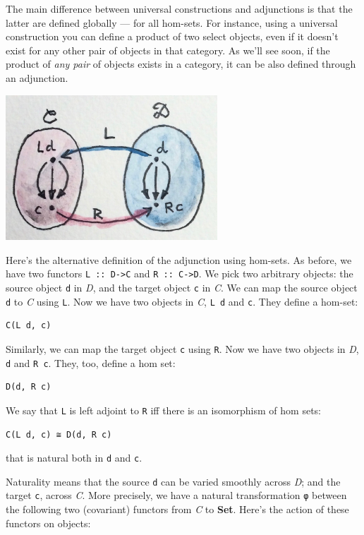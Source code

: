 The main difference between universal constructions and adjunctions is
that the latter are defined globally --- for all hom-sets. For instance,
using a universal construction you can define a product of two select
objects, even if it doesn't exist for any other pair of objects in that
category. As we'll see soon, if the product of \emph{any pair} of
objects exists in a category, it can be also defined through an
adjunction.

\includegraphics[width=3.12500in]{images/adj-homsets.jpg}

Here's the alternative definition of the adjunction using hom-sets. As
before, we have two functors \texttt{L\ ::\ D-\textgreater{}C} and
\texttt{R\ ::\ C-\textgreater{}D}. We pick two arbitrary objects: the
source object \texttt{d} in \emph{D}, and the target object \texttt{c}
in \emph{C}. We can map the source object \texttt{d} to \emph{C} using
\texttt{L}. Now we have two objects in \emph{C}, \texttt{L\ d} and
\texttt{c}. They define a hom-set:

\begin{verbatim}
C(L d, c)
\end{verbatim}

Similarly, we can map the target object \texttt{c} using \texttt{R}. Now
we have two objects in \emph{D}, \texttt{d} and \texttt{R\ c}. They,
too, define a hom set:

\begin{verbatim}
D(d, R c)
\end{verbatim}

We say that \texttt{L} is left adjoint to \texttt{R} iff there is an
isomorphism of hom sets:

\begin{verbatim}
C(L d, c) ≅ D(d, R c)
\end{verbatim}

that is natural both in \texttt{d} and \texttt{c}.

Naturality means that the source \texttt{d} can be varied smoothly
across \emph{D}; and the target \texttt{c}, across \emph{C}. More
precisely, we have a natural transformation \texttt{φ} between the
following two (covariant) functors from \emph{C} to \textbf{Set}. Here's
the action of these functors on objects:

